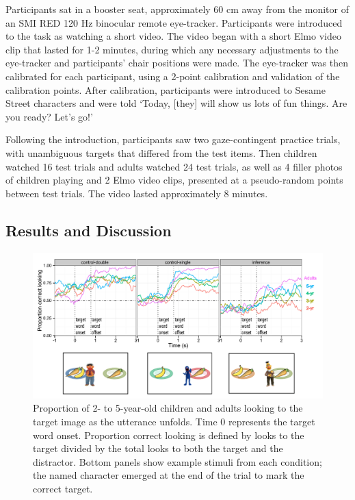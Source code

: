 \documentclass[10pt,letterpaper]{article}
\begin{document}
Participants sat in a booster seat, approximately 60 cm away from the monitor of an SMI RED 120 Hz binocular remote eye-tracker. Participants were introduced to the task as watching a short video. The video began with a short Elmo video clip that lasted for 1-2 minutes, during which any necessary adjustments to the eye-tracker and participants' chair positions were made. The eye-tracker was then calibrated for each participant, using a 2-point calibration and validation of the calibration points. After calibration, participants were introduced to Sesame Street characters and were told `Today, [they] will show us lots of fun things. Are you ready? Let's go!'

Following the introduction, participants saw two gaze-contingent practice trials, with unambiguous targets that differed from the test items. Then children watched 16 test trials and adults watched 24 test trials, as well as 4 filler photos of children playing and 2 Elmo video clips, presented at a pseudo-random points between test trials. The video lasted approximately 8 minutes.

\subsection{Results and Discussion}


\begin{figure}[t]
  \includegraphics[width=\textwidth]{figures/140521-simpimp_age-edit.pdf}
  \caption{\label{fig:age} Proportion of 2- to 5-year-old children and adults looking to the target image as the utterance unfolds. Time 0 represents the target word onset. Proportion correct looking is defined by looks to the target divided by the total looks to both the target and the distractor. Bottom panels show example stimuli from each condition; the named character emerged at the end of the trial to mark the correct target.}
\end{figure}
\end{document}
